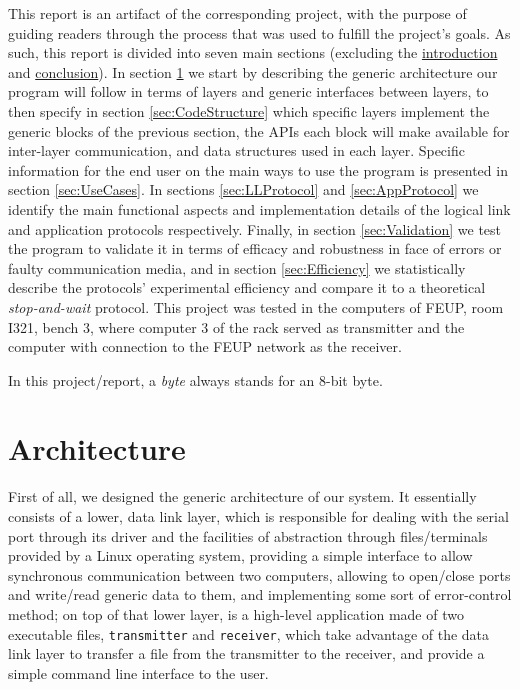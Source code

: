 \documentclass[a4paper, 11pt]{report}
\begin{document}
This report is an artifact of the corresponding project, with the purpose of guiding readers through the process that was used to fulfill the project's goals. As such, this report is divided into seven main sections (excluding the \hyperref[sec:Introduction]{introduction} and \hyperref[sec:Conclusion]{conclusion}). In section \ref{sec:Architecture} we start by describing the generic architecture our program will follow in terms of layers and generic interfaces between layers, to then specify in section \ref{sec:CodeStructure} which specific layers implement the generic blocks of the previous section, the APIs each block will make available for inter-layer communication, and data structures used in each layer. Specific information for the end user on the main ways to use the program is presented in section \ref{sec:UseCases}. In sections \ref{sec:LLProtocol} and \ref{sec:AppProtocol} we identify the main functional aspects and implementation details of the logical link and application protocols respectively. Finally, in section \ref{sec:Validation} we test the program to validate it in terms of efficacy and robustness in face of errors or faulty communication media, and in section \ref{sec:Efficiency} we statistically describe the protocols' experimental efficiency and compare it to a theoretical \textit{stop-and-wait} protocol. This project was tested in the computers of FEUP, room I321, bench 3, where computer 3 of the rack served as transmitter and the computer with connection to the FEUP network as the receiver.

In this project/report, a \textit{byte} always stands for an 8-bit byte.

\section{Architecture} \label{sec:Architecture}

First of all, we designed the generic architecture of our system. It essentially consists of a lower, data link layer, which is responsible for dealing with the serial port through its driver and the facilities of abstraction through files/terminals provided by a Linux operating system, providing a simple interface to allow synchronous communication between two computers, allowing to open/close ports and write/read generic data to them, and implementing some sort of error-control method; on top of that lower layer, is a high-level application made of two executable files, \texttt{transmitter} and \texttt{receiver}, which take advantage of the data link layer to transfer a file from the transmitter to the receiver, and provide a simple command line interface to the user.
\end{document}
